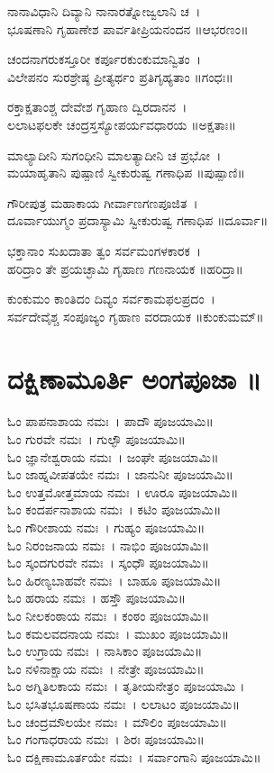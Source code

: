 ನಾನಾವಿಧಾನಿ ದಿವ್ಯಾನಿ ನಾನಾರತ್ನೋಜ್ವಲಾನಿ ಚ~।\\
ಭೂಷಣಾನಿ ಗೃಹಾಣೇಶ ಪಾರ್ವತೀಪ್ರಿಯನಂದನ ॥ಆಭರಣಂ॥

ಚಂದನಾಗರುಕಸ್ತೂರೀ ಕರ್ಪೂರಕುಂಕುಮಾನ್ವಿತಂ~।\\
ವಿಲೇಪನಂ ಸುರಶ್ರೇಷ್ಠ ಪ್ರೀತ್ಯರ್ಥಂ ಪ್ರತಿಗೃಹ್ಯತಾಂ ॥ಗಂಧಃ॥

ರಕ್ತಾಕ್ಷತಾಂಶ್ಚ ದೇವೇಶ ಗೃಹಾಣ ದ್ವಿರದಾನನ~।\\
ಲಲಾಟಫಲಕೇ ಚಂದ್ರಸ್ತಸ್ಯೋಪರ್ಯವಧಾರಯ ॥ಅಕ್ಷತಾಃ॥

ಮಾಲ್ಯಾದೀನಿ ಸುಗಂಧೀನಿ ಮಾಲತ್ಯಾದೀನಿ ಚ ಪ್ರಭೋ~।\\
ಮಯಾಹೃತಾನಿ ಪುಷ್ಪಾಣಿ ಸ್ವೀಕುರುಷ್ವ ಗಣಾಧಿಪ ॥ಪುಷ್ಪಾಣಿ॥

ಗೌರೀಪುತ್ರ ಮಹಾಕಾಯ ಗೀರ್ವಾಣಗಣಪೂಜಿತ~।\\
ದೂರ್ವಾಯುಗ್ಮಂ ಪ್ರದಾಸ್ಯಾಮಿ ಸ್ವೀಕುರುಷ್ವ ಗಣಾಧಿಪ ॥ದೂರ್ವಾ॥

ಭಕ್ತಾನಾಂ ಸುಖದಾತಾ ತ್ವಂ ಸರ್ವಮಂಗಳಕಾರಕ~।\\
ಹರಿದ್ರಾಂ ತೇ ಪ್ರಯಚ್ಛಾಮಿ ಗೃಹಾಣ ಗಣನಾಯಕ ॥ಹರಿದ್ರಾ॥

ಕುಂಕುಮಂ ಕಾಂತಿದಂ ದಿವ್ಯಂ ಸರ್ವಕಾಮಫಲಪ್ರದಂ~।\\
ಸರ್ವದೇವೈಶ್ಚ ಸಂಪೂಜ್ಯಂ ಗೃಹಾಣ ವರದಾಯಕ ॥ಕುಂಕುಮಮ್॥
\section{ದಕ್ಷಿಣಾಮೂರ್ತಿ ಅಂಗಪೂಜಾ ॥}
ಓಂ ಪಾಪನಾಶಾಯ ನಮಃ~। ಪಾದೌ ಪೂಜಯಾಮಿ॥\\
ಓಂ ಗುರವೇ ನಮಃ~। ಗುಲ್ಫೌ ಪೂಜಯಾಮಿ॥\\
ಓಂ ಜ್ಞಾನೇಶ್ವರಾಯ ನಮಃ~। ಜಂಘೇ ಪೂಜಯಾಮಿ॥\\
ಓಂ ಜಾಹ್ನವೀಪತಯೇ ನಮಃ~। ಜಾನುನೀ ಪೂಜಯಾಮಿ॥\\
ಓಂ ಉತ್ತಮೋತ್ತಮಾಯ ನಮಃ~। ಊರೂ ಪೂಜಯಾಮಿ॥\\
ಓಂ ಕಂದರ್ಪನಾಶಾಯ ನಮಃ~। ಕಟಿಂ ಪೂಜಯಾಮಿ॥\\
ಓಂ ಗೌರೀಶಾಯ ನಮಃ~। ಗುಹ್ಯಂ ಪೂಜಯಾಮಿ॥\\
ಓಂ ನಿರಂಜನಾಯ ನಮಃ~। ನಾಭಿಂ ಪೂಜಯಾಮಿ॥\\
ಓಂ ಸ್ಕಂದಗುರವೇ ನಮಃ~। ಸ್ಕಂಧೌ ಪೂಜಯಾಮಿ॥\\
ಓಂ ಹಿರಣ್ಯಬಾಹವೇ ನಮಃ~। ಬಾಹೂ ಪೂಜಯಾಮಿ॥\\
ಓಂ ಹರಾಯ ನಮಃ~। ಹಸ್ತೌ ಪೂಜಯಾಮಿ॥\\
ಓಂ ನೀಲಕಂಠಾಯ ನಮಃ~। ಕಂಠಂ ಪೂಜಯಾಮಿ॥\\
ಓಂ ಕಮಲವದನಾಯ ನಮಃ~। ಮುಖಂ ಪೂಜಯಾಮಿ॥\\
ಓಂ ಉಗ್ರಾಯ ನಮಃ~। ನಾಸಿಕಾಂ ಪೂಜಯಾಮಿ॥\\
ಓಂ ನಳಿನಾಕ್ಷಾಯ ನಮಃ~। ನೇತ್ರೇ ಪೂಜಯಾಮಿ॥\\
ಓಂ ಅಗ್ನಿತಿಲಕಾಯ ನಮಃ~। ತೃತೀಯನೇತ್ರಂ ಪೂಜಯಾಮಿ ।\\
ಓಂ ಭಸಿತಭೂಷಣಾಯ ನಮಃ~। ಲಲಾಟಂ ಪೂಜಯಾಮಿ॥\\
ಓಂ ಚಂದ್ರಮೌಲಯೇ ನಮಃ~। ಮೌಲಿಂ ಪೂಜಯಾಮಿ॥\\
ಓಂ ಗಂಗಾಧರಾಯ ನಮಃ~। ಶಿರಃ ಪೂಜಯಾಮಿ॥\\
ಓಂ ದಕ್ಷಿಣಾಮೂರ್ತಯೇ ನಮಃ~। ಸರ್ವಾಂಗಾನಿ ಪೂಜಯಾಮಿ॥
